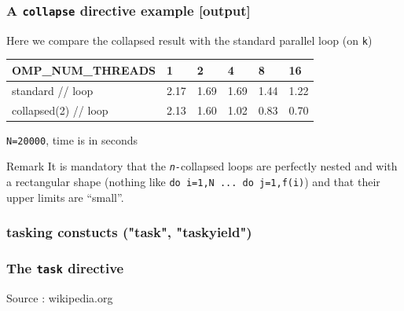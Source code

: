 \begin{frame}[containsverbatim]
\frametitle{A \texttt{collapse} directive example [output]}
\begin{block}{}
Here we compare the collapsed result with the standard parallel loop (on \texttt{k})
\end{block}

\begin{tabular}{|l|l|l|l|l|l|}
\hline
 \textbf{OMP\_NUM\_THREADS} & \textbf{1} & \textbf{2} & \textbf{4} & \textbf{8} & \textbf{16}\\
\hline
\hline
standard // loop &2.17 &1.69 &1.69 &1.44 &1.22 \\
\hline
collapsed(2) // loop &2.13 &1.60 &1.02 &0.83 &0.70 \\
\hline
\end{tabular}

\texttt{N=20000}, time is in seconds

\begin{block}{Remark}
It is mandatory that the \textit{\texttt{n-}}collapsed loops are perfectly nested and with a rectangular shape (nothing like \texttt{do i=1,N ... do j=1,f(i)}) and that their upper limits are ``small''.
\end{block}



\end{frame}




\subsubsection{tasking constucts ("task", "taskyield")}

\begin{frame}[containsverbatim]
\frametitle{The \texttt{task} directive}
\begin{center}
    {}
\end{center}
Source : wikipedia.org
\end{frame}


